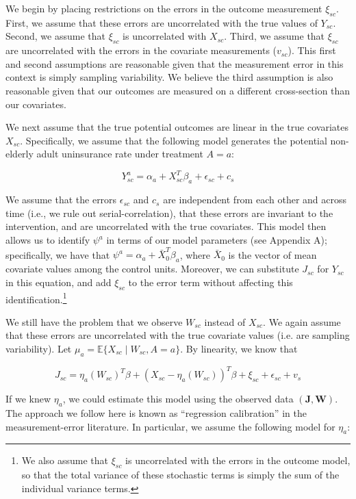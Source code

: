 \documentclass[aoas]{imsart}
\theoremstyle{plain}
\newcommand{\matr}[1]{\mathbf{#1}} %
\theoremstyle{remark}
\begin{document}
We begin by placing restrictions on the errors in the outcome measurement $\xi_{sc}$. First, we assume that these errors are uncorrelated with the true values of $Y_{sc}$. Second, we assume that $\xi_{sc}$ is uncorrelated with $X_{sc}$. Third, we assume that $\xi_{sc}$ are uncorrelated with the errors in the covariate measurements ($v_{sc}$). This first and second assumptions are reasonable given that the measurement error in this context is simply sampling variability. We believe the third assumption is also reasonable given that our outcomes are measured on a different cross-section than our covariates. 

We next assume that the true potential outcomes are linear in the true covariates $X_{sc}$. Specifically, we assume that the following model generates the potential non-elderly adult uninsurance rate under treatment $A = a$:

\begin{equation}
Y_{sc}^a = \alpha_a + X_{sc}^T\beta_a + \epsilon_{sc} + c_s
\end{equation}

We assume that the errors $\epsilon_{sc}$ and $c_s$ are independent from each other and across time (i.e., we rule out serial-correlation), that these errors are invariant to the intervention, and are uncorrelated with the true covariates. This model then allows us to identify $\psi^a$ in terms of our model parameters (see Appendix A); specifically, we have that $\psi^a = \alpha_a + \bar{X}_0^T\beta_a$, where $\bar{X}_0$ is the vector of mean covariate values among the control units. Moreover, we can substitute $J_{sc}$ for $Y_{sc}$ in this equation, and add $\xi_{sc}$ to the error term without affecting this identification.\footnote{We also assume that $\xi_{sc}$ is uncorrelated with the errors in the outcome model, so that the total variance of these stochastic terms is simply the sum of the individual variance terms.} 

We still have the problem that we observe $W_{sc}$ instead of $X_{sc}$. We again assume that these errors are uncorrelated with the true covariate values (i.e. are sampling variability). Let $\mu_a = \mathbb{E}\{X_{sc} \mid W_{sc}, A = a\}$. By linearity, we know that

\begin{equation}
    J_{sc} = \eta_a(W_{sc})^T\beta + (X_{sc} - \eta_a(W_{sc}))^T\beta + \xi_{sc} + \epsilon_{sc} + v_s 
\end{equation}

If we knew $\eta_a$, we could estimate this model using the observed data $(\matr{J}, \matr{W})$. The approach we follow here is known as ``regression calibration'' in the measurement-error literature. In particular, we assume the following model for $\eta_a$:
\end{document}
